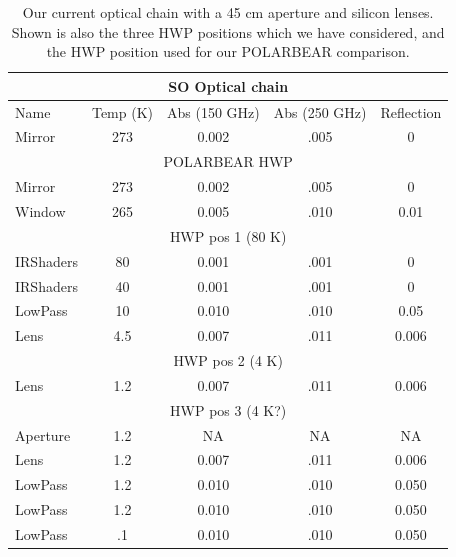 \documentclass{article}
\theoremstyle{remark}
\begin{document}
\begin{table}
\begin{center}

\begin{tabular}{ |l|c|c|c|c|} 
	\hline
	\multicolumn{5}{|c|}{SO Optical chain}\\
	\hline
	 Name 		& Temp (K)	& Abs (150 GHz) & Abs (250 GHz) & Reflection \\ \hline
	 Mirror 	&	273		& 0.002 & .005 & 0 \\
	 \hline \multicolumn{5}{|c|}{POLARBEAR HWP }\\ \hline
	 Mirror 	&	273		& 0.002 & .005 & 0 \\
	 Window 	&	265		& 0.005 & .010 & 0.01 \\
	 \hline \multicolumn{5}{|c|}{HWP pos 1 (80 K)}\\ \hline
	 IRShaders 	&	80		& 0.001 & .001 & 0 \\
	 IRShaders 	&	40		& 0.001 & .001 & 0 \\
	 LowPass 	&	10		& 0.010 & .010 & 0.05 \\
	 Lens 		&	4.5		& 0.007 & .011 & 0.006 \\
	 \hline \multicolumn{5}{|c|}{HWP pos 2 (4 K)}\\ \hline
	 Lens 		&	1.2		& 0.007 & .011 & 0.006 \\
	 \hline \multicolumn{5}{|c|}{HWP pos 3 (4 K?)}\\ \hline
	 Aperture 	&	1.2		&  NA  &  NA  & NA \\
	 Lens 		&	1.2		& 0.007 & .011 & 0.006 \\
	 LowPass 	&	1.2		& 0.010 & .010 & 0.050 \\
	 LowPass 	&	1.2		& 0.010 & .010 & 0.050 \\
	 LowPass 	&	.1		& 0.010 & .010 & 0.050 \\
	\hline	
\end{tabular}
\end{center}
\caption{Our current optical chain with a 45 cm aperture and silicon lenses.
Shown is also the three HWP positions which we have considered, and the HWP position used for our POLARBEAR comparison.
}

\label{table:SO_OpticalChain}
\end{table}
\end{document}
